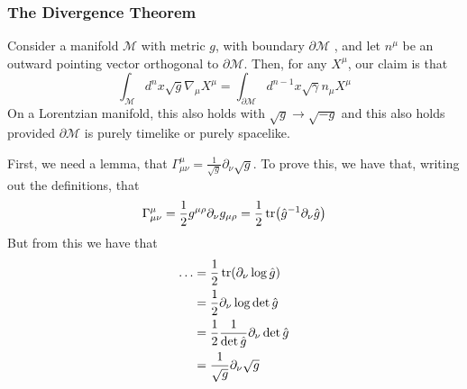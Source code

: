 \subsubsection{The Divergence Theorem} 
Consider a manifold $ \mathcal{ M } $ with 
metric $ g $, with 
boundary $ \partial  \mathcal{ M } $ , and
let $ n ^ \mu $ be an outward pointing 
vector orthogonal to $ \partial  \mathcal{ M } $. 
Then, for any $  X^ \mu $, our claim is that 
\[
 \int_{ \mathcal{ M } } d^ n x \sqrt{ g }  \nabla _ \mu X^ \mu = \int _{ \partial  \mathcal{ M } } d^{ n - 1} x \sqrt{ \gamma }  n_\mu 	 X ^ \mu 
\]   On a Lorentzian manifold, this also holds 
with $ \sqrt{ g  }  \to \sqrt{  - g}   $ and this 
also holds provided $ \partial   \mathcal{ M } $ is 
purely timelike or purely spacelike. 

First, we need a lemma, that $ \Gamma^{ \mu } _{ \mu \nu }  = \frac{1}{ \sqrt{ g }  } \partial_\nu \sqrt{ g } $. To prove this, we have that, writing out 
the definitions, that 
\[
	\Gamma ^ \mu _{ \mu \nu }  = \frac{1}{ 2  } g ^{ \mu \rho } \partial  _ \nu g _{ \mu \rho } = \frac{1}{2 }\tr ( \hat{ g } ^{ - 1 } \partial  _ \nu \hat{ g } ) 
\] But from this we have that 
\begin{align*}
	\dots &= \frac{1}{2 } \tr ( \partial  _\nu \log \hat{ g } )    \\
	      &=  \frac{1}{2 } \partial  _ \nu \log \det \hat{ g }  \\
	      &=  \frac{1}{2 } \frac{1}{ \det \hat{ g } } \partial  _ \nu \det \hat{ g }  \\
	      &=  \frac{1}{ \sqrt{ g } } \partial _ \nu \sqrt{ g }  	
\end{align*}

\pagebreak 
